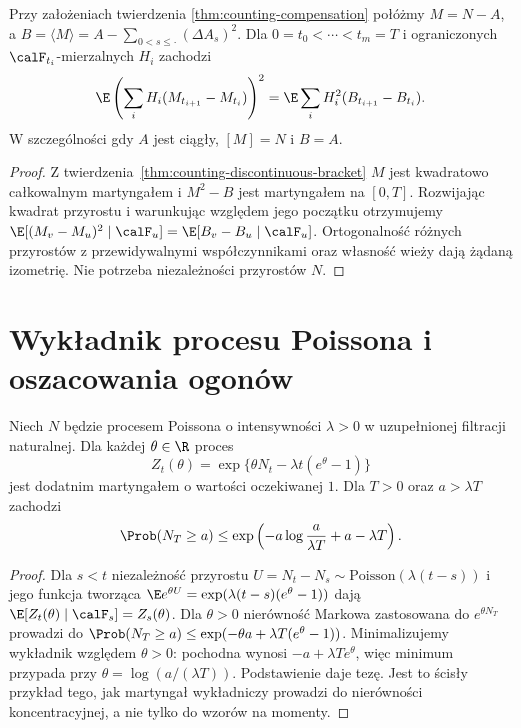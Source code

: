 \begin{twierdzenie}
\label{thm:counting-compensated-isometry}
Przy założeniach twierdzenia
\ref{thm:counting-compensation} połóżmy $M=N-A$,
a $B=\langle M\rangle=A-\sum_{0<s\le\cdot}(\Delta A_s)^2$.
Dla $0=t_0<\cdots<t_m=T$ i ograniczonych
$\calF_{t_i}$-mierzalnych $H_i$ zachodzi
\[
\E\left(\sum_i H_i(M_{t_{i+1}}-M_{t_i})\right)^2
=\E\sum_i H_i^2(B_{t_{i+1}}-B_{t_i}).
\]
W szczególności gdy $A$ jest ciągły,
$[M]=N$ i $B=A$.
\end{twierdzenie}
\begin{proof}
Z twierdzenia~\ref{thm:counting-discontinuous-bracket}
$M$ jest kwadratowo całkowalnym martyngałem
i $M^2-B$ jest martyngałem na $[0,T]$.
Rozwijając kwadrat przyrostu i warunkując
względem jego początku otrzymujemy
$\E[(M_v-M_u)^2\mid\calF_u]
=\E[B_v-B_u\mid\calF_u]$.
Ortogonalność różnych przyrostów
z przewidywalnymi współczynnikami
oraz własność wieży dają żądaną izometrię.
Nie potrzeba niezależności przyrostów $N$.
\end{proof}

\section{Wykładnik procesu Poissona i oszacowania ogonów}
\begin{twierdzenie}
\label{thm:poisson-exponential-mart}
Niech $N$ będzie procesem Poissona o intensywności
$\lambda>0$ w uzupełnionej filtracji naturalnej.
Dla każdej $\theta\in\R$ proces
\[
Z_t(\theta)=\exp\{\theta N_t-\lambda t(e^\theta-1)\}
\]
jest dodatnim martyngałem o wartości oczekiwanej $1$.
Dla $T>0$ oraz $a>\lambda T$ zachodzi
\[
\Prob(N_T\ge a)\le
\exp\left(-a\log\frac{a}{\lambda T}+a-\lambda T\right).
\]
\end{twierdzenie}
\begin{proof}
Dla $s<t$ niezależność przyrostu
$U=N_t-N_s\sim\mathrm{Poisson}(\lambda(t-s))$
i jego funkcja tworząca
$\E e^{\theta U}=\exp(\lambda(t-s)(e^\theta-1))$
dają $\E[Z_t(\theta)\mid\calF_s]=Z_s(\theta)$.
Dla $\theta>0$ nierówność Markowa zastosowana do
$e^{\theta N_T}$ prowadzi do
$\Prob(N_T\ge a)\le
\exp(-\theta a+\lambda T(e^\theta-1))$.
Minimalizujemy wykładnik względem $\theta>0$:
pochodna wynosi $-a+\lambda Te^\theta$, więc
minimum przypada przy $\theta=\log(a/(\lambda T))$.
Podstawienie daje tezę. Jest to ścisły przykład tego,
jak martyngał wykładniczy prowadzi do nierówności
koncentracyjnej, a nie tylko do wzorów na momenty.
\end{proof}

